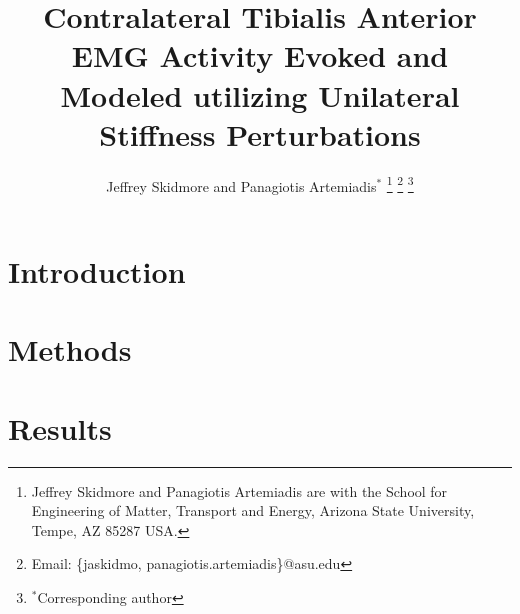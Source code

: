 \documentclass[journal]{IEEEtran}
\begin{document}
\title{Contralateral Tibialis Anterior EMG Activity Evoked and Modeled utilizing Unilateral Stiffness Perturbations}


\author{
        Jeffrey Skidmore and Panagiotis Artemiadis$^*$%
\thanks{Jeffrey Skidmore and Panagiotis Artemiadis are with the School for Engineering of Matter, Transport and Energy, Arizona State University, Tempe, AZ 85287 USA.}
\thanks{\hspace{-0.15in} Email: \{jaskidmo, panagiotis.artemiadis\}@asu.edu}
\thanks{\hspace{-0.15in} $^*$Corresponding author}}

\maketitle

\begin{abstract}
%
\end{abstract}

\IEEEpeerreviewmaketitle

\section{Introduction}
%
\section{Methods}

\section{Results}

%




\balance
\end{document}
